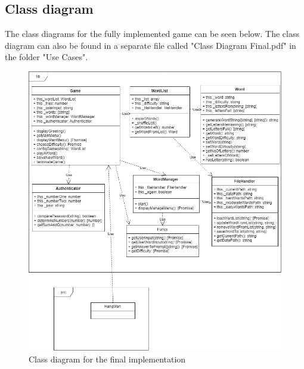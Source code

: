 \documentclass[12pt, letterpaper]{article}
\begin{document}
\subsection{Class diagram}
The class diagrams for the fully implemented game can be seen below. The class diagram can also be found in a separate file called "Class Diagram Final.pdf" in the folder "Use Cases".
\begin{figure}[H]\label{fig5}
	\centering
	\includegraphics[scale=0.5]{classdiagramfinal.png}
	\caption{Class diagram for the final implementation}
\end{figure}
\end{document}
